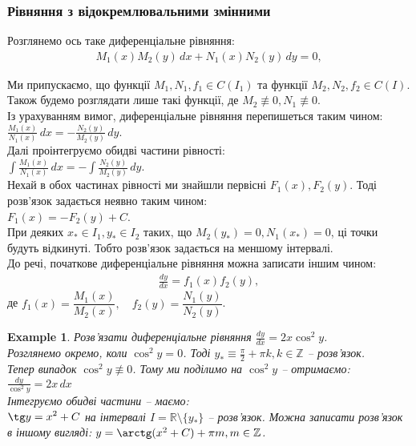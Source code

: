 \documentclass[a4paper, 10pt]{article}
\theoremstyle{theoremdd}
\theoremstyle{theoremdd}
\theoremstyle{theoremdd}
\theoremstyle{theoremdd}
\newtheorem{example}[theorem]{Example}
\theoremstyle{theoremdd}
\theoremstyle{theoremdd}
\theoremstyle{theoremdd}
\theoremstyle{theoremdd}
\begin{document}
	\subsubsection{Рівняння з відокремлювальними змінними}
	Розглянемо ось таке диференціальне рівняння:
	\begin{align*}
	M_1(x)M_2(y)\,dx+N_1(x)N_2(y)\,dy=0,
	\end{align*}
	\iffalse
	або ще можна переписати інакшим чином:
	\begin{align*}
	\frac{dy}{dx} = f_1(x) f_2(y)
	\end{align*}
	\fi
	Ми припускаємо, що функції $M_1, N_1, f_1 \in C(I_1)$ та функції $M_2, N_2, f_2 \in C(I)$. Також будемо розглядати лише такі функції, де $M_2 \not\equiv 0, N_1 \not\equiv 0$. \\
	Із урахуванням вимог, диференціальне рівняння перепишеться таким чином:\\
	$\displaystyle \frac{M_1(x)}{N_1(x)}\,dx = -\frac{N_2(y)}{M_2(y)}\,dy$.\\
	Далі проінтегруємо обидві частини рівності:\\
	$\displaystyle \int \frac{M_1(x)}{N_1(x)}\,dx = - \int \frac{N_2(y)}{M_2(y)}\,dy$.\\
	Нехай в обох частинах рівності ми знайшли первісні $F_1(x), F_2(y)$. Тоді розв'язок задається неявно таким чином:\\
	$F_1(x)=-F_2(y)+C$.
	\bigskip \\
	При деяких $x_* \in I_1, y_* \in I_2$ таких, що $M_2(y_*) = 0, N_1(x_*)=0$, ці точки будуть відкинуті. Тобто розв'язок задається на меншому інтервалі.
	\bigskip \\
	До речі, початкове диференціальне рівняння можна записати іншим чином:
	\begin{align*}
	\frac{dy}{dx} = f_1(x) f_2(y),
	\end{align*}
	де $f_1(x) = \dfrac{M_1(x)}{M_2(x)}, \quad f_2(y) = \dfrac{N_1(y)}{N_2(y)}$. 
		
	\begin{example}
 Розв'язати диференціальне рівняння $\displaystyle \frac{dy}{dx}=2x \cos^2 y$.\\
	Розглянемо окремо, коли $\cos^2 y=0$. Тоді $\displaystyle y_* \equiv \frac{\pi}{2} + \pi k, k \in \mathbb{Z}$ -- розв'язок.\\
	Тепер випадок $\cos^2 y \not\equiv 0$. Тому ми поділимо на $\cos ^2 y$ -- отримаємо:\\
	$\displaystyle \frac{dy}{\cos^2 y} = 2x\,dx$\\
	Інтегруємо обидві частини -- маємо:\\
	$\displaystyle \tg y = x^2 + C$ на інтервалі $I = \mathbb{R} \setminus \{y_*\}$ -- розв'язок. Можна записати розв'язок в іншому вигляді: $y = \arctg (x^2+C) + \pi m, m \in \mathbb{Z}$.
	\end{example}
	
\end{document}
